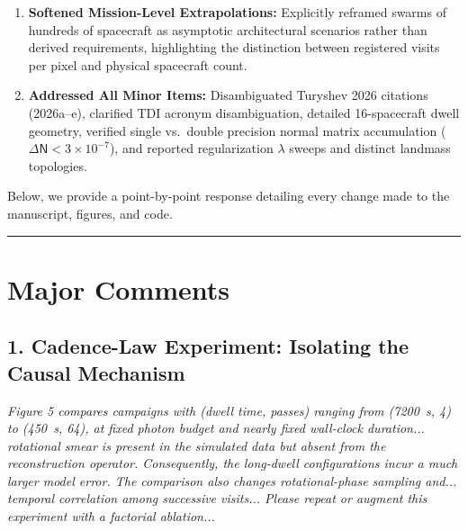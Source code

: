 \documentclass[11pt]{article}
\begin{document}
\begin{enumerate}
\item \textbf{Softened Mission-Level Extrapolations:} Explicitly reframed swarms of hundreds of spacecraft as asymptotic architectural scenarios rather than derived requirements, highlighting the distinction between registered visits per pixel and physical spacecraft count.
\item \textbf{Addressed All Minor Items:} Disambiguated Turyshev 2026 citations (2026a--e), clarified TDI acronym disambiguation, detailed 16-spacecraft dwell geometry, verified single vs.\ double precision normal matrix accumulation ($\Delta\mathsf{N} < 3\times10^{-7}$), and reported regularization $\lambda$ sweeps and distinct landmass topologies.
\end{enumerate}

Below, we provide a point-by-point response detailing every change made to the manuscript, figures, and code.

\vspace{4mm}
\hrule
\vspace{2mm}
\section*{Major Comments}

\subsection*{1. Cadence-Law Experiment: Isolating the Causal Mechanism}

\begin{refcomment}
\textit{Figure 5 compares campaigns with (dwell time, passes) ranging from (7200~s, 4) to (450~s, 64), at fixed photon budget and nearly fixed wall-clock duration... rotational smear is present in the simulated data but absent from the reconstruction operator. Consequently, the long-dwell configurations incur a much larger model error. The comparison also changes rotational-phase sampling and... temporal correlation among successive visits... Please repeat or augment this experiment with a factorial ablation...}
\end{refcomment}
\end{document}
